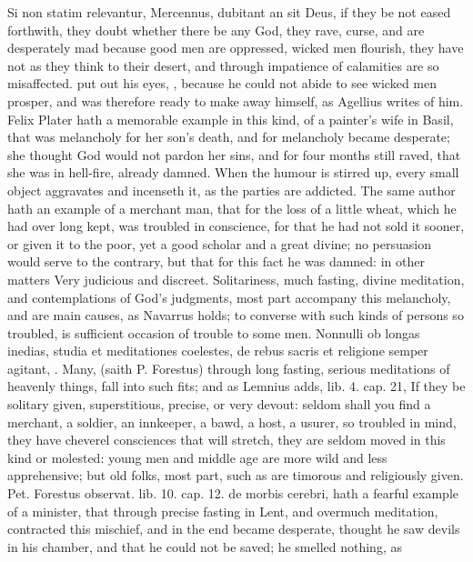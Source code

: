 {Si non statim relevantur, Mercennus, dubitant an sit Deus, if
they be not eased forthwith, they doubt whether there be any God, they
rave, curse, and are desperately mad because good men are oppressed,
wicked men flourish, they have not as they think to their desert, and
through impatience of calamities are so misaffected. \Democritus{} put out
his eyes, , because he
could not abide to see wicked men prosper, and was therefore ready to
make away himself, as Agellius writes of him. Felix Plater hath a
memorable example in this kind, of a painter's wife in Basil, that was
melancholy for her son's death, and for melancholy became desperate;
she thought God would not pardon her sins, and for four months
still raved, that she was in hell-fire, already damned. When the humour
is stirred up, every small object aggravates and incenseth it, as the
parties are addicted. The same author hath an example of a
merchant man, that for the loss of a little wheat, which he had over
long kept, was troubled in conscience, for that he had not sold it
sooner, or given it to the poor, yet a good scholar and a great divine;
no persuasion would serve to the contrary, but that for this fact he
was damned: in other matters Very judicious and discreet. Solitariness,
much fasting, divine meditation, and contemplations of God's judgments,
most part accompany this melancholy, and are main causes, as
Navarrus holds; to converse with such kinds of persons so
troubled, is sufficient occasion of trouble to some men. Nonnulli ob
longas inedias, studia et meditationes coelestes, de rebus sacris et
religione semper agitant, \etc{}. Many, (saith P. Forestus) through long
fasting, serious meditations of heavenly things, fall into such fits;
and as Lemnius adds, lib. 4. cap. 21, If they be solitary given,
superstitious, precise, or very devout: seldom shall you find a
merchant, a soldier, an innkeeper, a bawd, a host, a usurer, so
troubled in mind, they have cheverel consciences that will stretch,
they are seldom moved in this kind or molested: young men and middle
age are more wild and less apprehensive; but old folks, most part, such
as are timorous and religiously given. Pet. Forestus observat. lib. 10.
cap. 12. de morbis cerebri, hath a fearful example of a minister, that
through precise fasting in Lent, and overmuch meditation, contracted
this mischief, and in the end became desperate, thought he saw devils
in his chamber, and that he could not be saved; he smelled nothing, as
}
